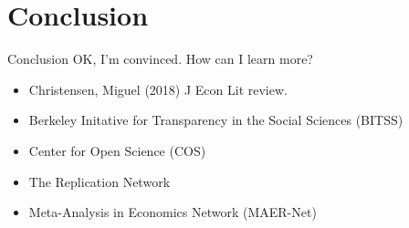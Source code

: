 \documentclass[aspectratio=169]{beamer}
\begin{document}


\section{Conclusion}
\begin{frame}{Conclusion}
OK, I'm convinced. How can I learn more?

\begin{itemize}[<.->]
\item Christensen, Miguel (2018) J Econ Lit review. \href{https://www.aeaweb.org/articles?id=10.1257/jel.20171350}{}
\item Berkeley Initative for Transparency in the Social Sciences (BITSS) \href{https://bitss.org/blog}{}
\item Center for Open Science (COS) \href{http://www.cos.io/}{}
\item The Replication Network \href{http://replicationnetwork.com/}{}
\item Meta-Analysis in Economics Network (MAER-Net) \href{http://www.maer-net.org/}{}
\end{itemize}
\end{frame}

\end{document}

